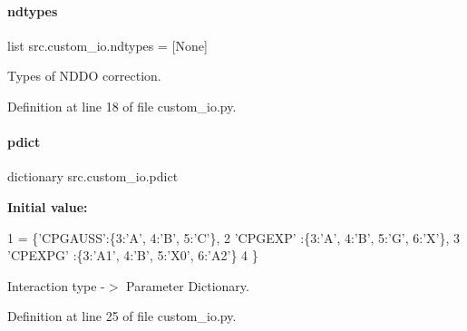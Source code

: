 \paragraph{\texorpdfstring{ndtypes}{ndtypes}}
{\footnotesize\ttfamily list src.\+custom\+\_\+io.\+ndtypes = \mbox{[}None\mbox{]}}



Types of N\+D\+DO correction. 



Definition at line 18 of file custom\+\_\+io.\+py.

\mbox{\label{namespacesrc_1_1custom__io_a32bbeb2bf67c2dcc1d953f8f844541a5}} 
\paragraph{\texorpdfstring{pdict}{pdict}}
{\footnotesize\ttfamily dictionary src.\+custom\+\_\+io.\+pdict}

{\bfseries Initial value\+:}
\begin{DoxyCode}
1 =  \{\textcolor{stringliteral}{'CPGAUSS'}:\{3:\textcolor{stringliteral}{'A'}, 4:\textcolor{stringliteral}{'B'}, 5:\textcolor{stringliteral}{'C'}\},
2          \textcolor{stringliteral}{'CPGEXP'} :\{3:\textcolor{stringliteral}{'A'}, 4:\textcolor{stringliteral}{'B'}, 5:\textcolor{stringliteral}{'G'}, 6:\textcolor{stringliteral}{'X'}\},
3          \textcolor{stringliteral}{'CPEXPG'} :\{3:\textcolor{stringliteral}{'A1'}, 4:\textcolor{stringliteral}{'B'}, 5:\textcolor{stringliteral}{'X0'}, 6:\textcolor{stringliteral}{'A2'}\}
4          \}
\end{DoxyCode}


Interaction type -\/$>$ Parameter Dictionary. 



Definition at line 25 of file custom\+\_\+io.\+py.

